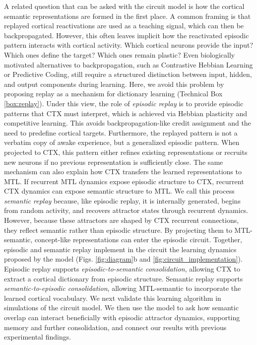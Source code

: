 \documentclass{article}
\begin{document}
\newline\newline
A related question that can be asked with the circuit model is how the cortical semantic representations are formed in the first place. A common framing is that replayed cortical reactivations are used as a teaching signal, which can then be backpropagated. However, this often leaves implicit how the reactivated episodic pattern interacts with cortical activity. Which cortical neurons provide the input? Which ones define the target? Which ones remain plastic? Even biologically motivated alternatives to backpropagation, such as Contrastive Hebbian Learning or Predictive Coding, still require a structured distinction between input, hidden, and output components during learning.
\newline\newline
Here, we avoid this problem by proposing replay as a mechanism for dictionary learning (Technical Box \ref{box:replay}). Under this view, the role of \textit{episodic replay} is to provide episodic patterns that CTX must interpret, which is achieved via Hebbian plasticity and competitive learning. This avoids backpropagation-like credit assignment and the need to predefine cortical targets. Furthermore, the replayed pattern is not a verbatim copy of awake experience, but a generalized episodic pattern. When projected to CTX, this pattern either refines existing representations or recruits new neurons if no previous representation is sufficiently close.
\newline\newline
The same mechanism can also explain how CTX transfers the learned representations to MTL. If recurrent MTL dynamics expose episodic structure to CTX, recurrent CTX dynamics can expose semantic structure to MTL. We call this process \textit{semantic replay} because, like episodic replay, it is internally generated, begins from random activity, and recovers attractor states through recurrent dynamics. However, because these attractors are shaped by CTX recurrent connections, they reflect semantic rather than episodic structure. By projecting them to MTL-semantic, concept-like representations can enter the episodic circuit.
\newline\newline
Together, episodic and semantic replay implement in the circuit the learning dynamics proposed by the model (Figs. \ref{fig:diagram}b and \ref{fig:circuit_implementation}). Episodic replay supports \textit{episodic-to-semantic consolidation}, allowing CTX to extract a cortical dictionary from episodic structure. Semantic replay supports \textit{semantic-to-episodic consolidation}, allowing MTL-semantic to incorporate the learned cortical vocabulary. We next validate this learning algorithm in simulations of the circuit model. We then use the model to ask how semantic overlap can interact beneficially with episodic attractor dynamics, supporting memory and further consolidation, and connect our results with previous experimental findings.
\end{document}
